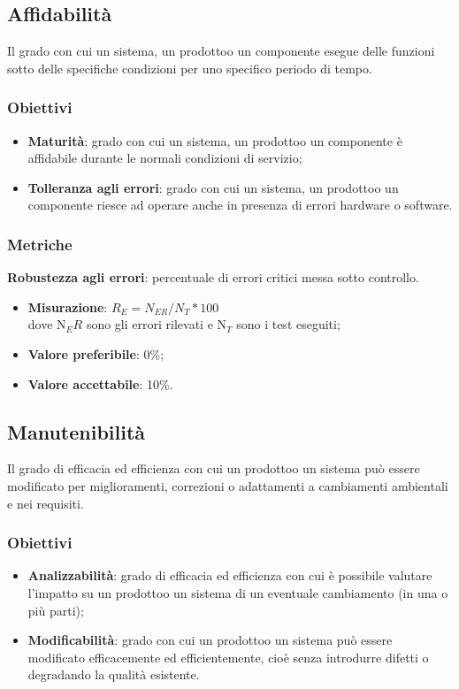     \subsection{Affidabilità}
        Il grado con cui un sistema, un prodotto\glosp o un componente esegue delle funzioni sotto delle specifiche condizioni per uno specifico periodo di tempo.
        \subsubsection{Obiettivi}
            \begin{itemize}
                \item \textbf{Maturità}: grado con cui un sistema, un prodotto\glosp o un componente è affidabile durante le normali condizioni di servizio;
                \item \textbf{Tolleranza agli errori}: grado con cui un sistema, un prodotto\glosp o un componente riesce ad operare anche in presenza di errori hardware o software.
            \end{itemize}
        \subsubsection{Metriche}
            \textbf{Robustezza agli errori}: percentuale di errori critici messa sotto controllo.
                \begin{itemize}
                    \item \textbf{Misurazione}: $R_E=N_{ER}/N_{T}*100$ \\
                    dove N$_ER$ sono gli errori rilevati e N$_T$ sono i test eseguiti;
                    \item \textbf{Valore preferibile}: 0\%;
                    \item \textbf{Valore accettabile}: 10\%.
                \end{itemize}
    \subsection{Manutenibilità}
        Il grado di efficacia ed efficienza con cui un prodotto\glosp o un sistema può essere modificato per miglioramenti, correzioni o adattamenti a cambiamenti ambientali e nei requisiti.
        \subsubsection{Obiettivi}
        \begin{itemize}
            \item \textbf{Analizzabilità}: grado di efficacia ed efficienza con cui è possibile valutare l'impatto su un prodotto\glosp o un sistema di un eventuale cambiamento (in una o più parti);
            \item \textbf{Modificabilità}: grado con cui un prodotto\glosp o un sistema può essere modificato efficacemente ed efficientemente, cioè senza introdurre difetti o degradando la qualità esistente.
        \end{itemize}
